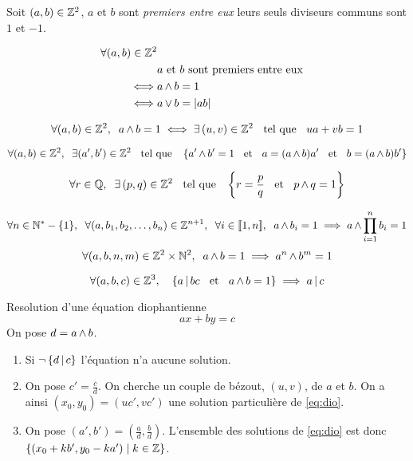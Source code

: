 \begin{dfn}
Soit $(a, b) \in \mathbb{Z}^2$, $a$ et $b$ sont \emph{premiers entre eux} \ssi
leurs seuls diviseurs communs sont $1$ et $-1$.
\end{dfn}

\begin{prp}
\begin{align*}
\forall (a, b) \in \mathbb{Z}^2 \\
        &a \text{ et } b \text{ sont premiers entre eux} \\
\iff    &a \operatorname{\wedge} b = 1 \\
\iff    &a \operatorname{\vee} b = |a b|
\end{align*}
\end{prp}

\begin{thm}[de Bézout]
\[
    \forall (a, b) \in \mathbb{Z}^2, \;\; a \operatorname{\wedge} b = 1 \iff
    \exists \, (u, v) \in \mathbb{Z}^2 \;\;\text{ tel que }\;\; u a + v b = 1
\]
\end{thm}

\begin{prp}
\[
    \forall (a, b) \in \mathbb{Z}^2, \;\; \exists (a', b') \in \mathbb{Z}^2 \;\;\text{ tel que }\;\;
    \left\{a' \operatorname{\wedge} b' = 1 \;\;\text{ et }\;\; a = (a \operatorname{\wedge} b) a'
    \;\;\text{ et }\;\; b = (a \operatorname{\wedge} b) b' \right\}
\]
\end{prp}

\begin{cor}
\[
    \forall r \in \mathbb{Q}, \;\; \exists \, (p , q) \in \mathbb{Z}^2 \;\;\text{ tel que }\;\; 
    \left\{ r = \frac{p}{q} \;\;\text{ et }\;\; p \operatorname{\wedge} q = 1 \right\}
\]
\end{cor}

\begin{prp}
\[
    \forall n \in \mathbb{N}^* - \{1\}, \;\;
    \forall (a, b_1, b_2, \ldots, b_n) \in \mathbb{Z}^{n + 1}, \;\;
    \forall i \in \llbracket 1, n \rrbracket, \;\; a \operatorname{\wedge} b_i = 1
    \implies a \operatorname{\wedge} \prod^n_{i  = 1} b_i = 1
\]
\[
    \forall (a, b, n, m) \in \mathbb{Z}^2 \times \mathbb{N}^2, \;\;
    a \operatorname{\wedge} b = 1 \implies a^n \operatorname{\wedge} b^m = 1
\]
\end{prp}

\begin{thm}[de Gausse]
\[
    \forall (a, b, c) \in \mathbb{Z}^3, \quad
    \left\{ a \operatorname{|} b c \;\;\text{ et }\;\; a \operatorname{\wedge} b = 1 \right\}
    \implies a \operatorname{|} c
\]
\end{thm}

\begin{met}
Resolution d'une équation diophantienne
\begin{equation}\label{eq:dio}
    a x + b y = c
\end{equation}
On pose $d = a \operatorname{\wedge} b$.
\begin{enumerate}
    \item Si $\neg \left\{d \operatorname{|} c\right\}$ l'équation n'a aucune
    solution.
    \item On pose $c' = \frac{c}{d}$.
    On cherche un couple de bézout, $(u, v)$, de $a$ et $b$. On a ainsi
    $(x_0, y_0) = \left(uc', vc'\right)$ une solution particulière de
    \eqref{eq:dio}.
    \item On pose $(a', b') = \left(\frac{a}{d}, \frac{b}{d}\right)$.
    L'ensemble des solutions de \eqref{eq:dio} est donc
    $\left\{ (x_0 + k b', y_0 - k a') \; \middle| \; k \in \mathbb{Z} \right\}$.
\end{enumerate}
\end{met}


